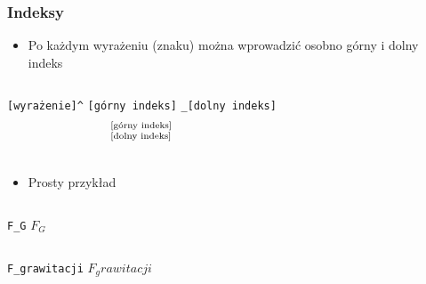 \documentclass{beamer}
\newcommand{\textoperatorname}[1]{%
  \operatorname{\textnormal{#1}}%
}%
\theoremstyle{newblock}
\begin{document}
\begin{frame}[fragile]
    \frametitle{Indeksy}
        \begin{itemize}
            \item Po każdym wyrażeniu (znaku) można wprowadzić osobno górny i dolny indeks
        \end{itemize}
        \begin{columns}[onlytextwidth, c]
            \centering
                \centering
                \verb|[wyrażenie]^| \verb|[górny indeks]| \verb|_[dolny indeks]| 
                \centering
                \begin{equation*}
                    [\textoperatorname{wyrażenie}]^{[\textoperatorname{górny indeks}]}_{[\textoperatorname{dolny indeks}]}
                \end{equation*}
        \end{columns}
        \vspace{0.5cm}
        \pause
        \begin{itemize}
            \item Prosty przykład
        \end{itemize}
        \begin{columns}
            \centering
                \centering
                \verb|F_G|
                \centering
                \pause
                $F_G$
        \end{columns}
        \begin{columns}            
                \centering
                \pause
                \verb|F_grawitacji|
                \pause
                \centering
                $F_grawitacji$
        \end{columns}
\end{frame}
\end{document}
